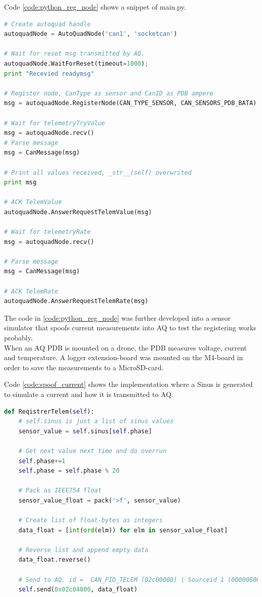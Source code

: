 Code \ref{code:python_reg_node} shows a snippet of main.py.

\begin{lstlisting}[language = python, caption = Snippet showing AQ registration from python, label=code:python_reg_node]
# Create autoquad handle
autoquadNode = AutoQuadNode('can1', 'socketcan')

# Wait for reset msg transmitted by AQ.
autoquadNode.WaitForReset(timeout=1000);
print "Recevied readymsg"

# Register node, CanType as sensor and CanID as PDB ampere
msg = autoquadNode.RegisterNode(CAN_TYPE_SENSOR, CAN_SENSORS_PDB_BATA)

# Wait for telemetryTryValue
msg = autoquadNode.recv()
# Parse message
msg = CanMessage(msg)

# Print all values received, _str__(self) overwrited
print msg

# ACK TelemValue
autoquadNode.AnswerRequestTelemValue(msg)

# Wait for telemetryRate
msg = autoquadNode.recv()

# Parse message
msg = CanMessage(msg)

# ACK TelemRate
autoquadNode.AnswerRequestTelemRate(msg)
\end{lstlisting}

The code in \ref{code:python_reg_node} was further developed into a sensor simulator that spoofs current measurements into AQ to test the registering works probably. \\
When an AQ PDB is mounted on a drone, the PDB measures voltage, current and temperature. A logger extension-board was mounted on the M4-board in order to save the measurements to a MicroSD-card.

Code \ref{code:spoof_current} shows the implementation where a Sinus is generated to simulate a current and how it is transmitted to AQ.

\begin{lstlisting}[language = python, caption = Snippet spoofing current measurements into AQ, label=code:spoof_current]
def ReqistrerTelem(self):
	# self.sinus is just a list of sinus values
	sensor_value = self.sinus[self.phase]

	# Get next value next time and do overrun
	self.phase+=1
	self.phase = self.phase % 20

	# Pack as IEEE754 float
	sensor_value_float = pack('>f', sensor_value)

	# Create list of float-bytes as integers
	data_float = [int(ord(elm)) for elm in sensor_value_float]

	# Reverse list and append empty data
	data_float.reverse()
	
	# Send to AQ. id =  CAN_FID_TELEM (02c00000) | Sourceid 1 (00000800) | CAN_SENSORS_PDB_BATA (00004000)
	self.send(0x02c04800, data_float)
\end{lstlisting}

